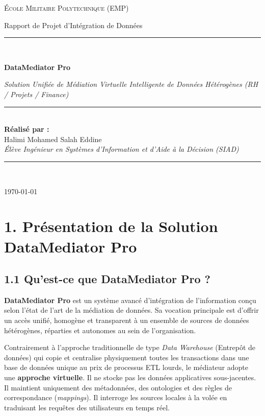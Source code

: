 \documentclass[11pt,a4paper]{article}
\begin{document}
\begin{titlepage}
    \centering
    \vspace*{1.5cm}
    {\scshape\LARGE École Militaire Polytechnique (EMP)\par}
    \vspace{1cm}
    {\Large Rapport de Projet d'Intégration de Données\par}
    \vspace{1.5cm}
    \rule{\linewidth}{1mm} \\[0.4cm]
    {\huge\bfseries DataMediator Pro\par}
    \vspace{0.3cm}
    {\Large \textit{Solution Unifiée de Médiation Virtuelle Intelligente de Données Hétérogènes (RH / Projets / Finance)}}\par
    \rule{\linewidth}{1mm} \\[1.5cm]
    
    \vspace{2cm}
    \textbf{Réalisé par :}\\
    {\Large Halimi Mohamed Salah Eddine}\\[0.5cm]
    \textit{Élève Ingénieur en Systèmes d'Information et d'Aide à la Décision (SIAD)}
    
    \vfill
    \rule{5cm}{0.4pt}\\[0.2cm]
    {\large \today\par}
\end{titlepage}

\tableofcontents
\newpage

\section{1. Présentation de la Solution DataMediator Pro}

\subsection{1.1 Qu'est-ce que DataMediator Pro ?}
\textbf{DataMediator Pro} est un système avancé d'intégration de l'information conçu selon l'état de l'art de la médiation de données. Sa vocation principale est d'offrir un accès unifié, homogène et transparent à un ensemble de sources de données hétérogènes, réparties et autonomes au sein de l'organisation. 

Contrairement à l'approche traditionnelle de type \textit{Data Warehouse} (Entrepôt de données) qui copie et centralise physiquement toutes les transactions dans une base de données unique au prix de processus ETL lourds, le médiateur adopte une \textbf{approche virtuelle}. Il ne stocke pas les données applicatives sous-jacentes. Il maintient uniquement des métadonnées, des ontologies et des règles de correspondance (\textit{mappings}). Il interroge les sources locales à la volée en traduisant les requêtes des utilisateurs en temps réel.
\end{document}
